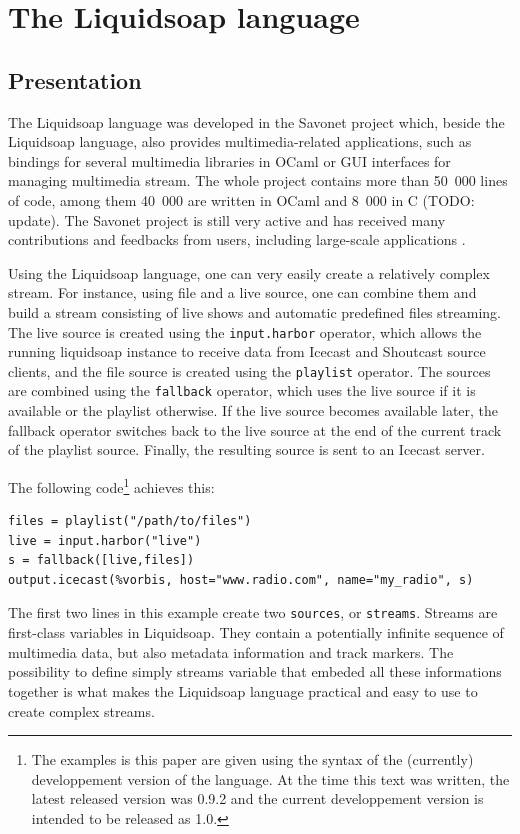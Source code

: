 \documentclass{llncs}
\newcommand{\liquidsoap}{Liquidsoap}
\newcommand{\savonet}{Savonet}
\begin{document}
\section{The \liquidsoap{} language}
\label{sec:lang}

\subsection*{Presentation}

The \liquidsoap{} language was developed in the \savonet{} project \cite{savonet}
which, beside the \liquidsoap{} language, also provides multimedia-related
applications, such as bindings for several multimedia libraries in OCaml or
GUI interfaces for managing multimedia stream. The whole project contains
more than 50~000 lines of code, among them 40~000 are written in OCaml
and 8~000 in C (TODO: update). The \savonet{} project is still very active
and has received many contributions and feedbacks from users, including
large-scale applications \cite{radionomy,virtualdj}.

Using the \liquidsoap{} language, one can very easily create a relatively complex stream. 
For instance, using file and a live source, one can combine them and build a stream consisting of 
live shows and automatic predefined files streaming. The live source is created using
the \texttt{input.harbor} operator, which allows the running liquidsoap instance to receive data from 
Icecast and Shoutcast source clients, and the file source is created using the \texttt{playlist} operator.
The sources are combined using the \texttt{fallback} operator, which uses the live source if it is available
or the playlist otherwise. If the live source becomes available later, the fallback operator switches back 
to the live source at the end of the current track of the playlist source. Finally, the resulting source 
is sent to an Icecast server.

The following code\footnote{The examples is this paper
are given using the syntax of the (currently) developpement version of the language. 
At the time this text was written, the latest released version was 0.9.2 and 
the current developpement version is intended to be released as 1.0.} achieves this:
\begin{verbatim}
files = playlist("/path/to/files")
live = input.harbor("live")
s = fallback([live,files])
output.icecast(%vorbis, host="www.radio.com", name="my_radio", s)
\end{verbatim}

The first two lines in this example create two \texttt{sources}, or \texttt{streams}. Streams are 
first-class variables in \liquidsoap{}. They contain a potentially infinite sequence of multimedia 
data, but also metadata information and track markers. The possibility to define simply streams 
variable that embeded all these informations together is what makes the \liquidsoap{} language 
practical and easy to use to create complex streams.
\end{document}
